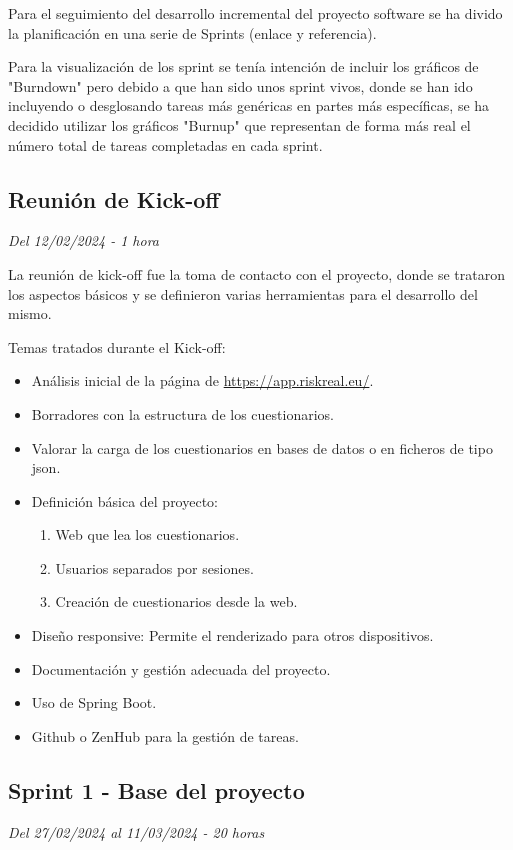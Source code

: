 Para el seguimiento del desarrollo incremental del proyecto software se ha divido la planificación en una serie de Sprints (enlace y referencia).

Para la visualización de los sprint se tenía intención de incluir los gráficos de "Burndown" pero debido a que han sido unos sprint vivos, donde se han ido incluyendo o desglosando tareas más genéricas en partes más específicas, se ha decidido utilizar los gráficos "Burnup" que representan de forma más real el número total de tareas completadas en cada sprint.

\subsection{Reunión de Kick-off}
\textit{Del 12/02/2024 - 1 hora}

La reunión de kick-off fue la toma de contacto con el proyecto, donde se trataron los aspectos básicos y se definieron varias herramientas para el desarrollo del mismo.

Temas tratados durante el Kick-off:
\begin{itemize}
	\item
	Análisis inicial de la página de \url{https://app.riskreal.eu/}.
	\item
	Borradores con la estructura de los cuestionarios.
	\item
	Valorar la carga de los cuestionarios en bases de datos o en ficheros de tipo json.
	\item
	Definición básica del proyecto:
	\begin{enumerate}
		\item
		Web que lea los cuestionarios.
		\item
		Usuarios separados por sesiones.
		\item
		Creación de cuestionarios desde la web.
	\end{enumerate}
	\item
	Diseño responsive: Permite el renderizado para otros dispositivos.
	\item
	Documentación y gestión adecuada del proyecto.
	\item
	Uso de Spring Boot.
	\item
	Github o ZenHub para la gestión de tareas.
\end{itemize}


\subsection{Sprint 1 - Base del proyecto}
\textit{Del 27/02/2024 al 11/03/2024 - 20 horas}

